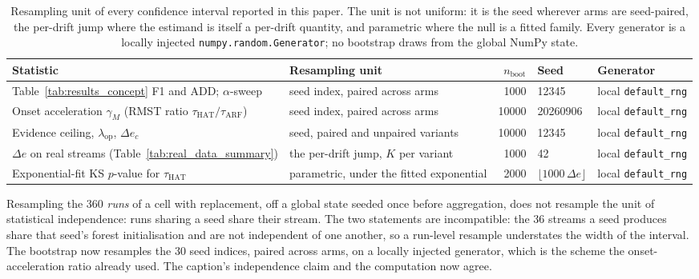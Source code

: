 \begin{table}[t]
  \centering
  \caption{Resampling unit of every confidence interval reported in this paper. The unit is not
  uniform: it is the seed wherever arms are seed-paired, the per-drift jump where the estimand is
  itself a per-drift quantity, and parametric where the null is a fitted family. Every generator is
  a locally injected \texttt{numpy.random.Generator}; no bootstrap draws from the global NumPy
  state.}
  \label{tab:protocol_ci}
  \small
  \begin{tabular}{@{}p{}p{}rlp{}@{}}
    \toprule
    \textbf{Statistic} & \textbf{Resampling unit} & \textbf{$n_{\mathrm{boot}}$} & \textbf{Seed} & \textbf{Generator} \\
    \midrule
    Table~\ref{tab:results_concept} F1 and ADD; $\alpha$-sweep & seed index, paired across arms & 1000 & 12345 & local \texttt{default\_rng} \\
    Onset acceleration $\gamma_M$ (RMST ratio $\tau_{\mathrm{HAT}}/\tau_{\mathrm{ARF}}$) & seed index, paired across arms & 10000 & 20260906 & local \texttt{default\_rng} \\
    Evidence ceiling, $\lambda_{\mathrm{op}}$, $\Delta e_c$ & seed, paired and unpaired variants & 10000 & 12345 & local \texttt{default\_rng} \\
    $\Delta e$ on real streams (Table~\ref{tab:real_data_summary}) & the per-drift jump, $K$ per variant & 1000 & 42 & local \texttt{default\_rng} \\
    Exponential-fit KS $p$-value for $\tau_{\mathrm{HAT}}$ & parametric, under the fitted exponential & 2000 & $\lfloor 1000\,\Delta e \rfloor$ & local \texttt{default\_rng} \\
    \bottomrule
  \end{tabular}
\end{table}

\begin{remark}\label{rem:boot_unit} Resampling the 360 \emph{runs} of a cell with replacement, off a global state seeded once before aggregation, does not resample the unit of statistical independence: runs sharing a seed share their stream. The two statements are incompatible: the 36 streams a seed produces
  share that seed's forest initialisation and are not independent of one another, so a run-level
  resample understates the width of the interval. The bootstrap now resamples the 30 seed indices,
  paired across arms, on a locally injected generator, which is the scheme the onset-acceleration ratio already
  used. The caption's independence claim and the computation now agree.
\end{remark}

